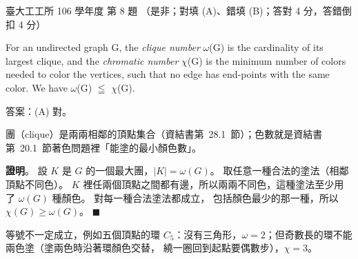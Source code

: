 \begin{pastexam}[label={px:ntu-106-ie-ds-08}]{臺大工工所 106 學年度 第 8 題}
（是非；對填 (A)、錯填 (B)；答對 4 分，答錯倒扣 4 分）

For an undirected graph G, the \textit{clique number} $\omega$(G) is the cardinality of its largest
clique, and the \textit{chromatic number} $\chi$(G) is the minimum number of colors needed to color the
vertices, such that no edge has end-points with the same color. We have $\omega$(G) $\leqq$ $\chi$(G).
\end{pastexam}

\begin{pastsoln}
答案：(A) 對。

團（clique）是兩兩相鄰的頂點集合（資結書第~28.1~節）；色數就是資結書第~20.1~節著色問題裡「能塗的最小顏色數」。

\textbf{證明}。 設 $K$ 是 $G$ 的一個最大團，$|K| = \omega(G)$。 取任意一種合法的塗法（相鄰頂點不同色）。
$K$ 裡任兩個頂點之間都有邊，所以兩兩不同色，這種塗法至少用了 $\omega(G)$ 種顏色。 對每一種合法塗法都成立，
包括顏色最少的那一種，所以 $\chi(G) \ge \omega(G)$。 \hfill$\blacksquare$

等號不一定成立，例如五個頂點的環 $C_5$：沒有三角形，$\omega = 2$；但奇數長的環不能兩色塗（塗兩色時沿著環顏色交替，
繞一圈回到起點要偶數步），$\chi = 3$。
\end{pastsoln}
